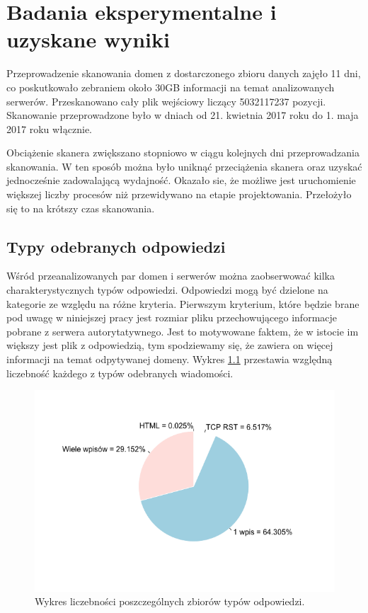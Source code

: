 \chapter{Badania eksperymentalne i uzyskane wyniki}
\noindent Przeprowadzenie skanowania domen z dostarczonego zbioru danych zajęło 11 dni, co poskutkowało zebraniem około 30GB informacji na
temat analizowanych serwerów. Przeskanowano cały plik wejściowy liczący 5032117237 pozycji. Skanowanie przeprowadzone było
w dniach od 21. kwietnia 2017 roku do 1. maja 2017 roku włącznie.

Obciążenie skanera zwiększano stopniowo w ciągu kolejnych dni przeprowadzania skanowania. W ten sposób można było uniknąć przeciążenia
skanera oraz uzyskać jednocześnie zadowalającą wydajność. Okazało sie, że możliwe jest uruchomienie większej liczby procesów niż
przewidywano na etapie projektowania. Przełożyło się to na krótszy czas skanowania.

\section{Typy odebranych odpowiedzi}\label{sec:typy}
\noindent Wśród przeanalizowanych par domen i serwerów można zaobserwować kilka charakterystycznych typów odpowiedzi. Odpowiedzi mogą być
dzielone na kategorie ze względu na różne kryteria. Pierwszym kryterium, które będzie brane pod uwagę w niniejszej pracy jest
rozmiar pliku przechowującego informacje pobrane z serwera autorytatywnego. Jest to motywowane faktem, że w istocie im większy
jest plik z odpowiedzią, tym spodziewamy się, że zawiera on więcej informacji na temat odpytywanej domeny. Wykres \ref{fig:types}
przestawia względną liczebność każdego z typów odebranych wiadomości.

\begin{figure}[h]
	\centering
	\includegraphics[width=1.0\textwidth]{image/types}
	\caption{Wykres liczebności poszczególnych zbiorów typów odpowiedzi.}
	\label{fig:types}
\end{figure}

